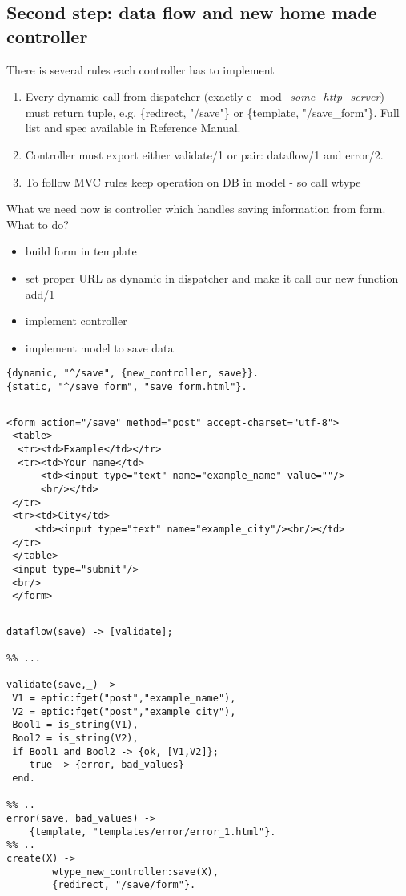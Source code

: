 \subsection{Second step: data flow and new home made controller}
There is several rules each controller has to implement
\begin{enumerate}
\item Every dynamic call from dispatcher (exactly
  e\_mod\_\textit{some\_http\_server}) must return tuple, e.g. \{redirect,
    "/save"\} or \{template,
    "/save\_form"\}. Full list and spec available in Reference Manual.
\item Controller must export either validate/1 or pair: dataflow/1 and
  error/2.
\item To follow MVC rules keep operation on DB in model - so call wtype
\end{enumerate}

What we need now is controller which handles saving information from form. 
What to do?
\begin{itemize}
  \item build form in template
  \item set proper URL as dynamic in dispatcher and make it call our new
    function add/1
  \item implement controller
  \item implement model to save data
\end{itemize}

\begin{Verbatim}[frame=single,
       framesep=2mm,
       label=dispatcher.conf,labelposition=topline,
       fontsize=\small]
{dynamic, "^/save", {new_controller, save}}.
{static, "^/save_form", "save_form.html"}.
\end{Verbatim}
$ $
\begin{Verbatim}[frame=single,
       framesep=2mm,
       label=save\_form.html,labelposition=topline,fontsize=\small]
 <form action="/save" method="post" accept-charset="utf-8">
 <table>
  <tr><td>Example</td></tr>
  <tr><td>Your name</td>
      <td><input type="text" name="example_name" value=""/>
      <br/></td>
 </tr>
 <tr><td>City</td>
     <td><input type="text" name="example_city"/><br/></td>
 </tr>
 </table>
 <input type="submit"/>
 <br/> 
 </form> 
\end{Verbatim}
$ $
\begin{Verbatim}[frame=single,fontsize=\small,
       framesep=2mm,
       label=new\_controller.erl,labelposition=topline]
dataflow(save) -> [validate];

%% ... 

validate(save,_) ->
 V1 = eptic:fget("post","example_name"),
 V2 = eptic:fget("post","example_city"),
 Bool1 = is_string(V1),
 Bool2 = is_string(V2),
 if Bool1 and Bool2 -> {ok, [V1,V2]};
    true -> {error, bad_values}
 end.

%% ..
error(save, bad_values) ->
	{template, "templates/error/error_1.html"}.
%% ..
create(X) -> 
        wtype_new_controller:save(X),
        {redirect, "/save/form"}.
\end{Verbatim}
